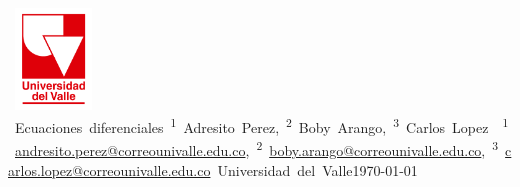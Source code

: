 \documentclass{article}
\makeatletter
\def\titulo{Ecuaciones diferenciales}
\def\autores{%
    \textsuperscript{1}~Adresito Perez,
    \textsuperscript{2}~Boby Arango,
    \textsuperscript{3}~Carlos Lopez
}
\def\correos{%
    \textsuperscript{1}~\url{andresito.perez@correounivalle.edu.co},
    \textsuperscript{2}~\url{boby.arango@correounivalle.edu.co},
    \textsuperscript{3}~\url{carlos.lopez@correounivalle.edu.co}
}
\def\institucion{Universidad del Valle}
\makeatother
\begin{document}

\hbox{
    \vbox{\hsize=1in \centering
        \includegraphics[width=0.8in]{recursos/RojoTransparenteUV.png}
        \vspace{25pt}
    }
    \vbox{\hsize=5in \centering
        {\huge\titulo}
        \\ \vspace{10pt}
        {\autores}
        \\ \vspace{0pt}
        {\correos}
        \\ \vspace{10pt}
        {\large\institucion}
        \\ \vspace{10pt}
        {\today}
        \\ \vspace{0pt}
    }
}





\begin{multicols}{2}








\printbibliography

\end{multicols}



\end{document}
